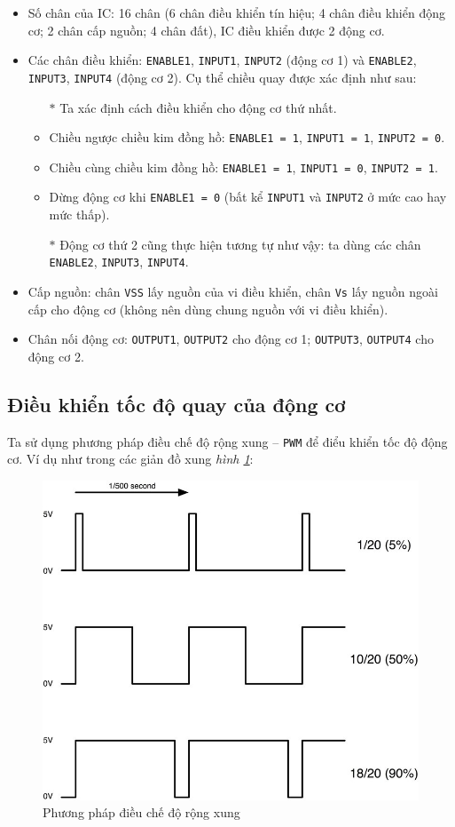 \begin{itemize}
\item Số chân của IC: 16 chân (6 chân điều khiển tín hiệu; 4 chân điều khiển động cơ; 2 chân cấp nguồn; 4 chân đất), IC điều khiển được 2 động cơ.
\item Các chân điều khiển: \verb|ENABLE1|, \verb|INPUT1|, \verb|INPUT2| (động cơ 1) và \verb|ENABLE2|, \verb|INPUT3|, \verb|INPUT4| (động cơ 2). Cụ thể chiều quay được xác định như sau:
\begin{itemize}
\item[$\ast$] Ta xác định cách điều khiển cho động cơ thứ nhất.
\item Chiều ngược chiều kim đồng hồ: \verb|ENABLE1 = 1|, \verb|INPUT1 = 1|, \verb|INPUT2 = 0|.
\item Chiều cùng chiều kim đồng hồ: \verb|ENABLE1 = 1|, \verb|INPUT1 = 0|, \verb|INPUT2 = 1|.
\item Dừng động cơ khi \verb|ENABLE1 = 0| (bất kể \verb|INPUT1| và \verb|INPUT2| ở mức cao hay mức thấp).
\item[$\ast$] Động cơ thứ 2 cũng thực hiện tương tự như vậy: ta dùng các chân \verb|ENABLE2|, \verb|INPUT3|, \verb|INPUT4|.
\end{itemize}
\item Cấp nguồn: chân \verb|VSS| lấy nguồn của vi điều khiển, chân \verb|Vs| lấy nguồn ngoài cấp cho động cơ (không nên dùng chung nguồn với vi điều khiển).
\item Chân nối động cơ: \verb|OUTPUT1|, \verb|OUTPUT2| cho động cơ 1; \verb|OUTPUT3|, \verb|OUTPUT4| cho động cơ 2.
\end{itemize}
\subsection{Điều khiển tốc độ quay của động cơ}
Ta sử dụng phương pháp điều chế độ rộng xung -- \verb|PWM| để điểu khiển tốc độ động cơ. Ví dụ như trong các giản đồ xung \textit{hình \ref{pwm}}:
\begin{figure}[!h]
\begin{center}
\includegraphics[width=.3\linewidth]{bai-8/image/pwm-1}
\end{center}
\caption{Phương pháp điều chế độ rộng xung} \label{pwm}
\end{figure}

